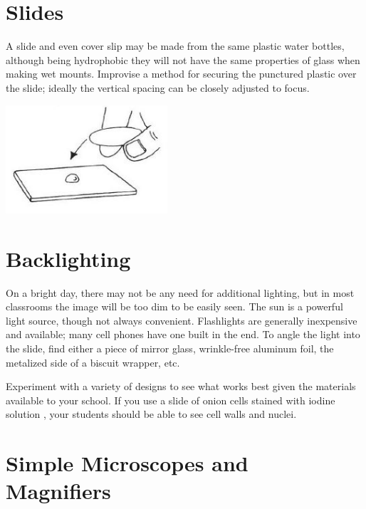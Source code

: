 \begin{multicols}{2}
\section{Slides}
A slide and even cover slip may be made from the same plastic water bottles, although being hydrophobic they will not have the same properties of glass when making wet mounts. Improvise a method for securing the punctured plastic over the slide; ideally the vertical spacing can be closely adjusted to focus.
\begin{center}
\includegraphics[width=0.45\textwidth]{./img/vso/slide-cover-slip.jpg}
\end{center}

\section{Backlighting}
On a bright day, there may not be any need for additional lighting, but in most classrooms the image will be too dim to be easily seen. The sun is a powerful light source, though not always convenient. Flashlights are generally inexpensive and available; many cell phones have one built in the end. To angle the light into the slide, find either a piece of mirror glass, wrinkle-free aluminum foil, the metalized side of a biscuit wrapper, etc.

Experiment with a variety of designs to see what works best given the materials available to your school. If you use a slide of onion cells stained with iodine solution
, your students should be able to see cell walls and nuclei.

\vfill
\columnbreak

\section{Simple Microscopes and \hfill \\ Magnifiers}


\end{multicols}
